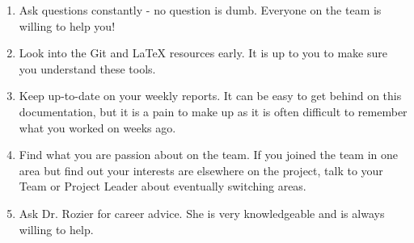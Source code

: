 \documentclass{article}
\begin{document}
\begin{enumerate}
	\item{Ask questions constantly - no question is dumb. Everyone on the team is willing to help you!}
	\item{Look into the Git and LaTeX resources early. It is up to you to make sure you understand these tools.}
	\item{Keep up-to-date on your weekly reports. It can be easy to get behind on this documentation, but it is a pain to make up as it is often difficult to 		remember what you worked on weeks ago.}
	\item{Find what you are passion about on the team. If you joined the team in one area but find out your interests are elsewhere on the project, talk to your Team or Project Leader about eventually switching areas.}
	\item{Ask Dr. Rozier for career advice. She is very knowledgeable and is always willing to help.}
\end{enumerate}
\end{document}
